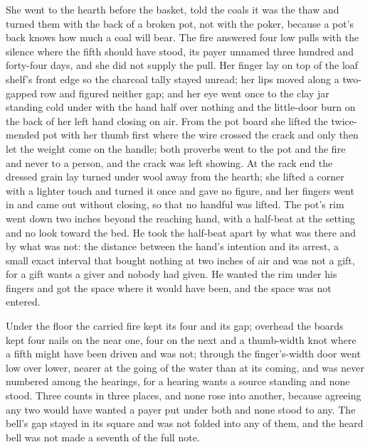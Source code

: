 She went to the hearth before the basket, told the coals it was the thaw and turned them with the back of a broken pot, not with the poker, because a pot's back knows how much a coal will bear. The fire answered four low pulls with the silence where the fifth should have stood, its payer unnamed three hundred and forty-four days, and she did not supply the pull. Her finger lay on top of the loaf shelf's front edge so the charcoal tally stayed unread; her lips moved along a two-gapped row and figured neither gap; and her eye went once to the clay jar standing cold under  with the hand half over nothing and the little-door burn on the back of her left hand closing on air. From the pot board she lifted the twice-mended pot with her thumb first where the wire crossed the crack and only then let the weight come on the handle; both proverbs went to the pot and the fire and never to a person, and the crack was left showing. At the rack end the dressed grain lay turned under wool away from the hearth; she lifted a corner with a lighter touch and turned it once and gave no figure, and her fingers went in and came out without closing, so that no handful was lifted. The pot's rim went down two inches beyond the reaching hand, with a half-beat at the setting and no look toward the bed. He took the half-beat apart by what was there and by what was not: the distance between the hand's intention and its arrest, a small exact interval that bought nothing at two inches of air and was not a gift, for a gift wants a giver and nobody had given. He wanted the rim under his fingers and got the space where it would have been, and the space was not entered.

Under the floor the carried fire kept its four and its gap; overhead the boards kept four nails on the near one, four on the next and a thumb-width knot where a fifth might have been driven and was not; through the finger's-width door  went low over lower, nearer at the going of the water than at its coming, and was never numbered among the hearings, for a hearing wants a source standing and none stood. Three counts in three places, and none rose into another, because agreeing any two would have wanted a payer put under both and none stood to any. The bell's gap stayed in its square and was not folded into any of them, and the heard bell was not made a seventh of the full note.

